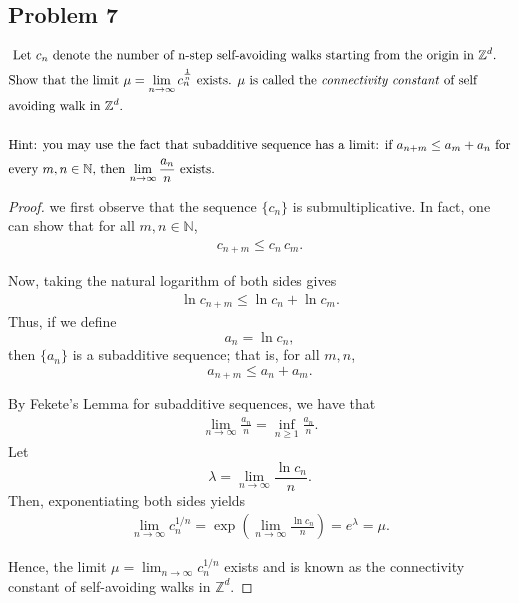 \documentclass[letterpaper, 11pt]{article}
\newcommand{\1}{\mathds{1}}	%
\theoremstyle{definition}
\begin{document}
\subsection*{Problem 7}
\begin{align*}
    &\text{ Let $c_n$ denote the number of n-step self-avoiding walks starting from the origin in $\mathbb{Z}^d$.} \\
    &\text{Show that the limit $\mu = \lim_{n \to \infty} c_n^{\frac{1}{n}}$ exists. $\mu$ is called the \textit{connectivity constant} of self} \\
    &\text{avoiding walk in $\mathbb{Z}^d$.} \\
\\
&\text{Hint: you may use the fact that subadditive sequence has a limit: if $a_{n+m} \leq a_m + a_n$ for} \\
&\text{every $m, n \in \mathbb{N}$, then $\lim_{n \to \infty} \frac{a_n}{n}$ exists.}
\end{align*}
\begin{proof}
    we first observe that the sequence \(\{c_n\}\) is submultiplicative. In fact, one can show that for all \(m,n\in\mathbb{N}\),
\begin{align*}
c_{n+m} \le c_n \, c_m.
\end{align*}

Now, taking the natural logarithm of both sides gives
\begin{align*}
\ln c_{n+m} \le \ln c_n + \ln c_m.
\end{align*}
Thus, if we define
\[
a_n = \ln c_n,
\]
then \(\{a_n\}\) is a subadditive sequence; that is, for all \(m,n\),
\[
a_{n+m} \le a_n + a_m.
\]

By Fekete's Lemma for subadditive sequences, we have that
\begin{align*}
\lim_{n \to \infty} \frac{a_n}{n} = \inf_{n\ge 1} \frac{a_n}{n}.
\end{align*}
Let
\[
\lambda = \lim_{n \to \infty} \frac{\ln c_n}{n}.
\]
Then, exponentiating both sides yields
\begin{align*}
\lim_{n \to \infty} c_n^{1/n} = \exp\left(\lim_{n \to \infty} \frac{\ln c_n}{n}\right) = e^{\lambda} = \mu.
\end{align*}

Hence, the limit \(\mu = \lim_{n \to \infty} c_n^{1/n}\) exists and is known as the connectivity constant of self-avoiding walks in \(\mathbb{Z}^d\).

\end{proof}
\end{document}
